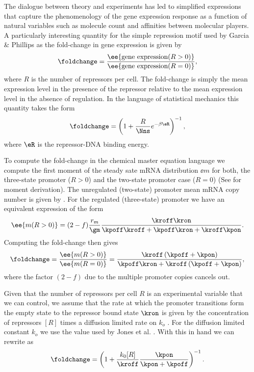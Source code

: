 The dialogue between theory and experiments has led to simplified expressions
that capture the phenomenology of the gene expression response as a function of
natural variables such as molecule count and affinities between molecular
players. A particularly interesting quantity for the simple repression motif
used by Garcia \& Phillips \cite{Garcia2011c} as the fold-change in gene
expression is given by
\begin{equation}
  \foldchange = {\ee{\text{gene expression}(R > 0)} \over
                 \ee{\text{gene expression}(R = 0)}},
\end{equation}
where $R$ is the number of repressors per cell. The fold-change is simply the
mean expression level in the presence of the repressor relative to the mean
expression level in the absence of regulation. In the language of statistical
mechanics this quantity takes the form \cite{Garcia2011c}
\begin{equation}
  \foldchange = \left( 1 + {R \over \Nns} e^{-\beta\eR} \right)^{-1},
  \label{seq_fc_thermo}
\end{equation}
where $\eR$ is the repressor-DNA binding energy.

To compute the fold-change in the chemical master equation language we compute
the first moment of the steady sate mRNA distribution $\ee{m}$ for both, the
three-state promoter ($R>0$) and the two-state promoter case ($R=0$) (See
 for moment derivation). The unregulated (two-state)
promoter mean mRNA copy number is given by . For
the regulated (three-state) promoter we have an equivalent expression of the
form
\begin{equation}
  \ee{m (R > 0)} = (2 - f){r_m \over \gm} {\kroff\kron
  \over \kpoff\kroff + \kpoff\kron + \kroff\kpon}.
\end{equation}
Computing the fold-change then gives
\begin{equation}
  \foldchange = {\ee{m (R > 0)} \over \ee{m (R = 0)}} =
  {\kroff \left( \kpoff + \kpon \right) \over
  \kpoff\kron + \kroff \left( \kpoff + \kpon \right)},
  \label{seq_fold_change_cme}
\end{equation}
where the factor $(2 -f)$ due to the multiple promoter copies cancels out.

Given that the number of repressors per cell $R$ is an experimental variable
that we can control, we assume that the rate at which the promoter transitions
form the empty state to the repressor bound state $\kron$ is given by the
concentration of repressors $[R]$ times a diffusion limited rate on $k_o$
\cite{Jones2014a}.  For the diffusion limited constant $k_o$ we use the value
used by Jones et al. \cite{Jones2014a} . With this in hand we can rewrite
 as
\begin{equation}
  \foldchange = \left( 1 + {k_0 [R] \over \kroff}
                {\kpon \over \kpon + \kpoff} \right)^{-1}.
  \label{seq_fc_kinetic}
\end{equation}

